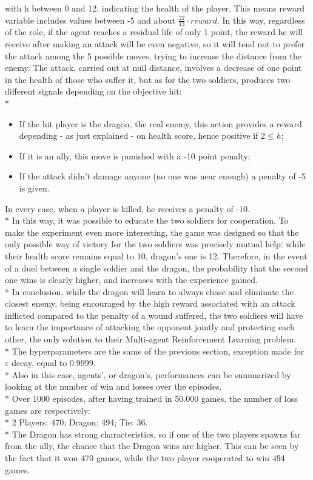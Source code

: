with h between 0 and 12, indicating the health of the player. This means reward variable includes values between -5 and about $\frac{22}{13}\cdot reward$. In this way, regardless of the role, if the agent reaches a residual life of only 1 point, the reward he will receive after making an attack will be even negative, so it will tend not to prefer the attack among the 5 possible moves, trying to increase the distance from the enemy. The attack, carried out at null distance, involves a decrease of one point in the health of those who suffer it, but as for the two soldiers, produces two different signals depending on the objective hit:\\*
\begin{itemize}[noitemsep, topsep=0ex]
  \item If the hit player is the dragon, the real enemy, this action provides a reward depending - as just explained - on health score, hence positive if $2\leq h$;
  \item If it is an ally, this move is punished with a -10 point penalty;
  \item If the attack didn't damage anyone (no one was near enough) a penalty of -5 is given.
\end{itemize}
In every case, when a player is killed, he receives a penalty of -10.\\*
In this way, it was possible to educate the two soldiers for cooperation. To make the experiment even more interesting, the game was designed so that the only possible way of victory for the two soldiers was precisely mutual help: while their health score remains equal to 10, dragon's one is 12. Therefore, in the event of a duel between a single soldier and the dragon, the probability that the second one wins is clearly higher, and increases with the experience gained.\\*
In conclusion, while the dragon will learn to always chase and eliminate the closest enemy, being encouraged by the high reward associated with an attack inflicted compared to the penalty of a wound suffered, the two soldiers will have to learn the importance of attacking the opponent jointly and protecting each other, the only solution to their Multi-agent Reinforcement Learning problem.\\*
The hyperparameters are the same of the previous section, exception made for $\varepsilon$ decay, equal to 0.9999.\\*
Also in this case, agents', or dragon's, performances can be summarized by looking at the number of win and losses over the episodes.\\*
Over 1000 episodes, after having trained in 50.000 games, the number of loss games are respectively:\\*
2 Players: 470; Dragon: 494; Tie: 36.\\*
The Dragon has strong characteristics, so if one of the two players spawns far from the ally, the chance that the Dragon wins are higher. This can be seen by the fact that it won 470 games, while the two player cooperated to win 494 games.

